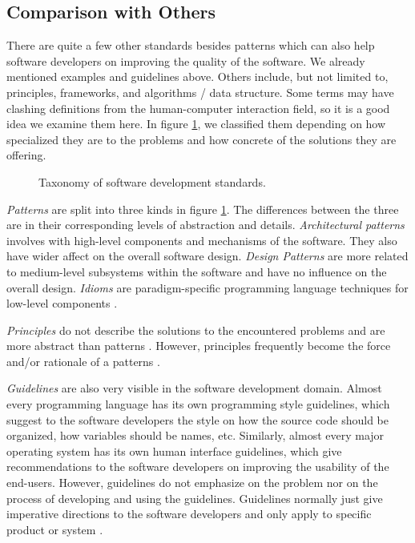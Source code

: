 \documentclass{acm_proc_article-sp}
\begin{document}
\subsection{Comparison with Others}
There are quite a few other standards besides patterns which can also
help software developers on improving the quality of the software. We
already mentioned examples and guidelines above. Others include, but
not limited to, principles, frameworks, and algorithms / data
structure. Some terms may have clashing definitions from the
human-computer interaction field, so it is a good idea we examine them
here. In figure \ref{fig:standards}, we classified them depending on
how specialized they are to the problems and how concrete of the
solutions they are offering.

\begin{figure}[!t]
\centering

\caption{Taxonomy of software development standards.}
\label{fig:standards}
\end{figure}

\textit{Patterns} are split into three kinds in figure
\ref{fig:standards}. The differences between the three are in their
corresponding levels of abstraction and details. \textit{Architectural
  patterns} involves with high-level components and mechanisms of the
software. They also have wider affect on the overall software
design. \textit{Design Patterns} are more related to medium-level
subsystems within the software and have no influence on the overall
design. \textit{Idioms} are paradigm-specific programming language
techniques for low-level components \citep{patterns:buschmann}.

\textit{Principles} do not describe the solutions to the encountered
problems and are more abstract than patterns
\citep{patterns:coplien}. However, principles frequently become the
force and/or rationale of a patterns \citep{patterns:appleton}.

\textit{Guidelines} are also very visible in the software development
domain. Almost every programming language has its own programming
style guidelines, which suggest to the software developers the style
on how the source code should be organized, how variables should be
names, etc. Similarly, almost every major operating system has its own
human interface guidelines, which give recommendations to the software
developers on improving the usability of the end-users. However,
guidelines do not emphasize on the problem nor on the process of
developing and using the guidelines. Guidelines normally just give
imperative directions to the software developers and only apply to
specific product or system \citep{patterns:griffiths}.
\end{document}
